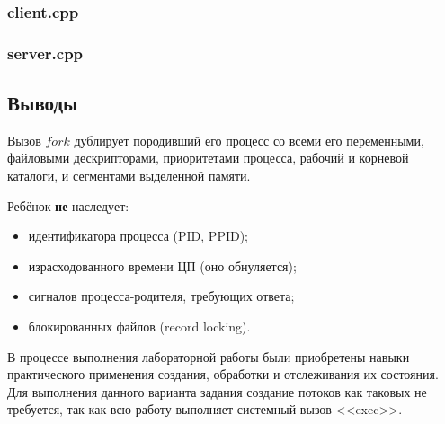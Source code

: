 \documentclass[12pt]{article}
\begin{document}
	
	
	\subsubsection*{client.cpp}
	
	
	
	\subsubsection*{server.cpp}
	
	
	
	\subsection*{Выводы}
	
	Вызов $fork$ дублирует породивший его процесс со всеми его переменными, файловыми дескрипторами, приоритетами процесса, рабочий и корневой каталоги, и сегментами выделенной памяти.
	
	Ребёнок {\bf не} наследует:
	\begin{itemize}
		\item идентификатора процесса (PID, PPID);
		\item израсходованного времени ЦП (оно обнуляется);
		\item сигналов процесса-родителя, требующих ответа;
		\item блокированных файлов (record locking).
	\end{itemize}
	
	В процессе выполнения лабораторной работы были приобретены навыки практического применения создания, обработки и отслеживания их состояния. Для выполнения данного варианта задания создание потоков как таковых не требуется, так как всю работу выполняет системный вызов <<exec>>.
	
\end{document}
